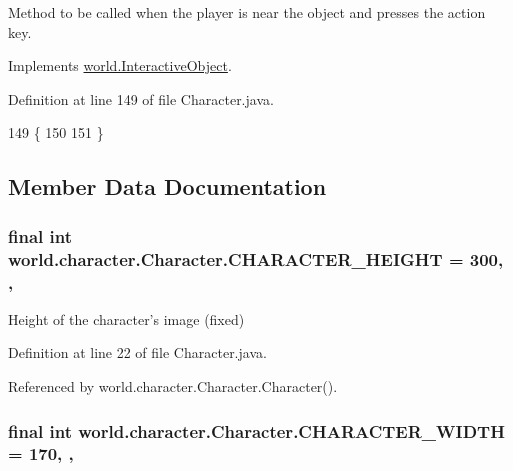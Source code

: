 Method to be called when the player is near the object and presses the action key. 



Implements \hyperlink{interfaceworld_1_1_interactive_object_a841a0e3dba2416de9a7d12c73725ec0d}{world.\-Interactive\-Object}.



Definition at line 149 of file Character.\-java.


\begin{DoxyCode}
149                                 \{
150 
151     \}
\end{DoxyCode}


\subsection{Member Data Documentation}
\hypertarget{classworld_1_1character_1_1_character_a31596c03022d61aeb8aac56f149309be}{
\subsubsection[{C\-H\-A\-R\-A\-C\-T\-E\-R\-\_\-\-H\-E\-I\-G\-H\-T}]{\setlength{\rightskip}{0pt plus 5cm}final int world.\-character.\-Character.\-C\-H\-A\-R\-A\-C\-T\-E\-R\-\_\-\-H\-E\-I\-G\-H\-T = 300\hspace{0.3cm}{\ttfamily [static]}, {\ttfamily [protected]}, {\ttfamily [inherited]}}}\label{classworld_1_1character_1_1_character_a31596c03022d61aeb8aac56f149309be}


Height of the character's image (fixed) 



Definition at line 22 of file Character.\-java.



Referenced by world.\-character.\-Character.\-Character().

\hypertarget{classworld_1_1character_1_1_character_a2a46ba03b3e10896b7757f891336e8b8}{
\subsubsection[{C\-H\-A\-R\-A\-C\-T\-E\-R\-\_\-\-W\-I\-D\-T\-H}]{\setlength{\rightskip}{0pt plus 5cm}final int world.\-character.\-Character.\-C\-H\-A\-R\-A\-C\-T\-E\-R\-\_\-\-W\-I\-D\-T\-H = 170\hspace{0.3cm}{\ttfamily [static]}, {\ttfamily [protected]}, {\ttfamily [inherited]}}}\label{classworld_1_1character_1_1_character_a2a46ba03b3e10896b7757f891336e8b8}


